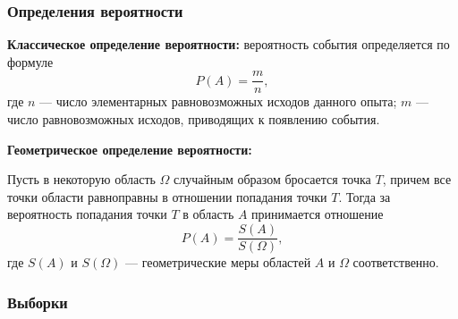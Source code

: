 \documentclass[a4paper]{article}
\newcommand{\key}[1]{{\color{Medium}\bfseries #1}}
\begin{document}
            \subsubsection{Определения вероятности}

                \key{Классическое определение вероятности:} \newline                
                вероятность события определяется по формуле
                \begin{equation*}
                    P(A) = \frac{m}{n} ,
                \end{equation*}
                где \newline
                $n$ --- число элементарных равновозможных исходов данного опыта; \newline
                $m$ --- число равновозможных исходов, приводящих к появлению события.

                \key{Геометрическое определение вероятности:}


                Пусть в некоторую область $\Omega$ случайным образом бросается точка $T$, причем все точки области равноправны в отношении попадания точки $T$. Тогда за вероятность попадания точки $T$ в область $A$ принимается отношение
                \begin{equation*}
                    P(A) = \frac{S(A)}{S(\Omega)} ,
                \end{equation*}
                где $S(A)$ и $S(\Omega)$ --- геометрические меры областей $A$ и $\Omega$ соответственно.

            \subsubsection{Выборки}
\end{document}
